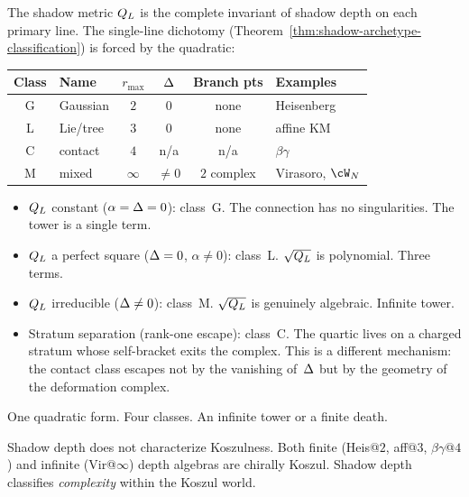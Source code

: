 The shadow metric $Q_L$ is the complete invariant of
shadow depth on each primary line. The single-line dichotomy
(Theorem~\ref{thm:shadow-archetype-classification}) is forced
by the quadratic:
\begin{center}
\small
\renewcommand{\arraystretch}{1.2}
\begin{tabular}{@{}clcccl@{}}
\textbf{Class} & \textbf{Name} & $r_{\max}$
 & $\Delta$ & \textbf{Branch pts} & \textbf{Examples} \\
\hline
G & Gaussian & $2$ & $0$
 & none & Heisenberg \\
L & Lie/tree & $3$ & $0$
 & none & affine KM \\
C & contact & $4$ & n/a
 & n/a & $\beta\gamma$ \\
M & mixed & $\infty$ & $\neq 0$
 & $2$ complex & Virasoro, $\cW_N$
\end{tabular}
\end{center}

\begin{itemize}
\item $Q_L$ constant ($\alpha = \Delta = 0$):
 class~G. The connection has no singularities. The tower
 is a single term.
\item $Q_L$ a perfect square ($\Delta = 0$,
 $\alpha \neq 0$): class~L. $\sqrt{Q_L}$ is
 polynomial. Three terms.
\item $Q_L$ irreducible ($\Delta \neq 0$):
 class~M. $\sqrt{Q_L}$ is genuinely algebraic.
 Infinite tower.
\item Stratum separation (rank-one escape): class~C. The
 quartic lives on a charged stratum whose self-bracket exits
 the complex. This is a different mechanism: the contact
 class escapes not by the vanishing of~$\Delta$ but by
 the geometry of the deformation complex.
\end{itemize}

One quadratic form. Four classes. An infinite tower or a
finite death.

\begin{remark}
\label{rem:comp-koszul-vs-depth}
Shadow depth does not characterize Koszulness. Both finite
(Heis@$2$, aff@$3$, $\beta\gamma$@$4$) and infinite
(Vir@$\infty$) depth algebras are chirally Koszul. Shadow
depth classifies \emph{complexity} within the Koszul world.
\end{remark}


